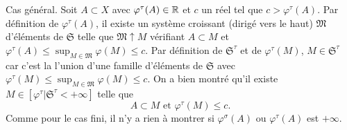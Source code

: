\begin{demo}
Cas général.\newline
Soit $A \subset X$ avec $\varphi^\tau(A) \in \mathbb{R}$ et $c$ un réel tel que $c > \varphi^\tau(A)$.\newline
Par définition de $\varphi^\tau(A)$, il existe un système croissant (dirigé vers le haut) $\mathfrak{M}$ d'éléments de $\mathfrak{S}$ telle que  $\mathfrak{M}\uparrow M$  vérifiant  $A \subset M$ et $\varphi^\tau(A) \leq \sup_{M \in \mathfrak{M}} \varphi(M) \leq c$.\newline
Par définition de $\mathfrak{S}^\tau$ et de $\varphi^\tau(M)$, $M \in \mathfrak{S}^\tau$ car c'est la l'union d'une famille d'éléments de $\mathfrak{S}$ avec $\varphi^\tau(M) \leq \sup_{M \in \mathfrak{M}} \varphi(M) \leq c$.\newline
On a bien montré qu'il existe $M \in [\varphi^\tau|\mathfrak{S}^{\tau} < +\infty]$ telle que
\begin{displaymath}
 A \subset M \text{ et } \varphi^\tau(M)  \leq c.
\end{displaymath}
Comme pour le cas fini, il n'y a rien à montrer si $\varphi^\sigma(A)$ ou $\varphi^\tau(A)$ est $+\infty$.
\end{demo}

